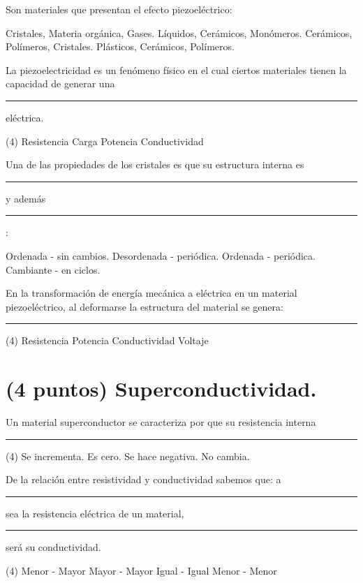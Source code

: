 \documentclass[12pt, letter]{exam}
\begin{document}
\begin{questions}
    \question Son materiales que presentan el efecto piezoeléctrico:
    \begin{multicols}{2}
    \begin{tasks}
        \task Cristales, Materia orgánica, Gases.
        \task Líquidos, Cerámicos, Monómeros.
        \task Cerámicos, Polímeros, Cristales.
        \task Plásticos, Cerámicos, Polímeros.
    \end{tasks}
    \end{multicols}
    \question La piezoelectricidad es un fenómeno físico en el cual ciertos materiales tienen la capacidad de generar una \rule{2cm}{0.1mm} eléctrica.
    \begin{tasks}(4)
        \task Resistencia
        \task Carga
        \task Potencia
        \task Conductividad
    \end{tasks}
    \question Una de las propiedades de los cristales es que su estructura interna es \rule{2cm}{0.1mm} y además \rule{2cm}{0.1mm}:
    \begin{multicols}{2}
        \begin{tasks}
            \task Ordenada - sin cambios.
            \task Desordenada - periódica.
            \task Ordenada - periódica.
            \task Cambiante - en ciclos.
        \end{tasks}
    \end{multicols}
    \question En la transformación de energía mecánica a eléctrica en un material piezoeléctrico, al deformarse la estructura del material se genera: \rule{2cm}{0.1mm}
    \begin{tasks}(4)
        \task Resistencia
        \task Potencia
        \task Conductividad
        \task Voltaje
    \end{tasks}
    
    \section{(4 puntos) Superconductividad.}

    \question Un material superconductor se caracteriza por que su resistencia interna \rule{2cm}{0.1mm}
    \begin{tasks}(4)
        \task Se incrementa.
        \task Es cero.
        \task Se hace negativa.
        \task No cambia.
    \end{tasks}
    \question De la relación entre resistividad y conductividad sabemos que: a \rule{2cm}{0.1mm} sea la resistencia eléctrica de un material, \rule{2cm}{0.1mm} será su conductividad.
    \begin{tasks}(4)
        \task Menor - Mayor
        \task Mayor - Mayor
        \task Igual - Igual
        \task Menor - Menor
    \end{tasks}


\end{questions}
\end{document}
